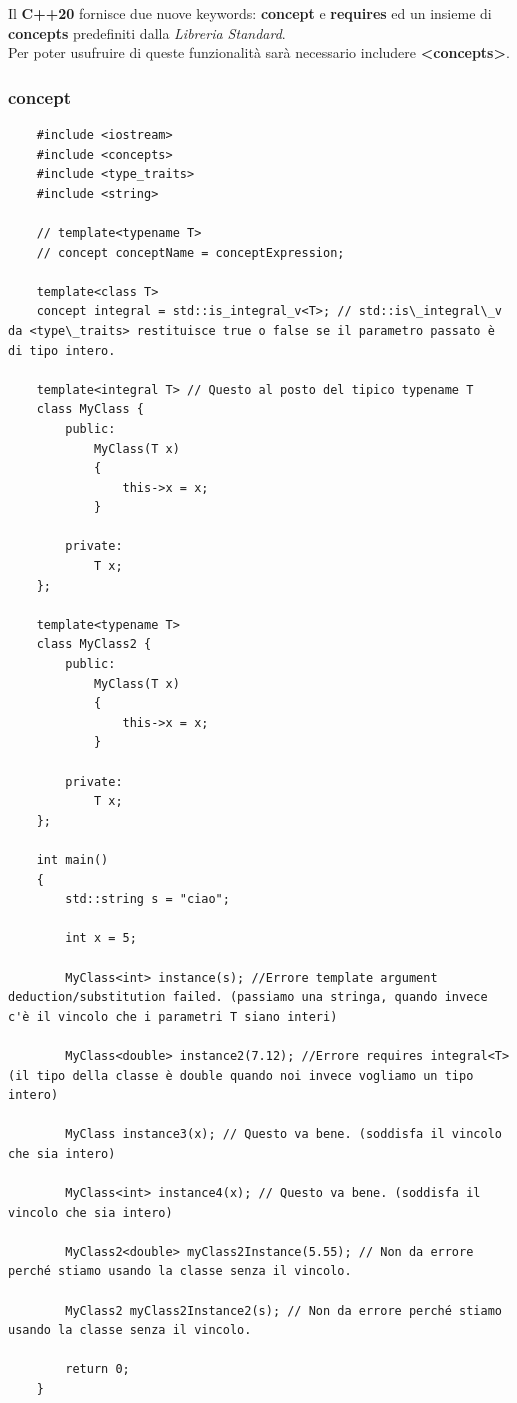 \textsf{\small Il \textbf{C++20} fornisce due nuove keywords: \textbf{concept} e \textbf{requires} ed un insieme di \textbf{concepts} predefiniti dalla \emph{Libreria Standard}.} \\

\textsf{\small Per poter usufruire di queste funzionalità sarà necessario includere \textbf{<concepts>}.} \\

\subsubsection{concept}

\begin{lstlisting}
	#include <iostream>
	#include <concepts>
	#include <type_traits>
	#include <string>
	
	// template<typename T>
	// concept conceptName = conceptExpression;
	
	template<class T>
	concept integral = std::is_integral_v<T>; // std::is\_integral\_v da <type\_traits> restituisce true o false se il parametro passato è di tipo intero.
	
	template<integral T> // Questo al posto del tipico typename T
	class MyClass {
		public:
			MyClass(T x)
			{
				this->x = x;   
			}
		
		private:
			T x;
	};

	template<typename T>
	class MyClass2 {
		public:
			MyClass(T x)
			{
				this->x = x;   
			}
		
		private:
			T x;
	};

	int main()
	{
		std::string s = "ciao";
		
		int x = 5;
		
		MyClass<int> instance(s); //Errore template argument deduction/substitution failed. (passiamo una stringa, quando invece c'è il vincolo che i parametri T siano interi)
		
		MyClass<double> instance2(7.12); //Errore requires integral<T> (il tipo della classe è double quando noi invece vogliamo un tipo intero)
		
		MyClass instance3(x); // Questo va bene. (soddisfa il vincolo che sia intero)
		
		MyClass<int> instance4(x); // Questo va bene. (soddisfa il vincolo che sia intero)
		
		MyClass2<double> myClass2Instance(5.55); // Non da errore perché stiamo usando la classe senza il vincolo.
		
		MyClass2 myClass2Instance2(s); // Non da errore perché stiamo usando la classe senza il vincolo.
		
		return 0;
	}
\end{lstlisting}

